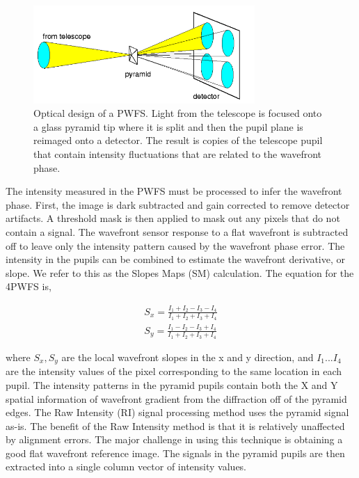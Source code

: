 \begin{figure}
    \centering
    \includegraphics[width=0.75\textwidth]{Chapter Materials/Chapter Two Materials/pyramid.png}
    \caption{Optical design of a PWFS. Light from the telescope is focused onto a glass pyramid tip where it is split and then the pupil plane is reimaged onto a detector. The result is copies of the telescope pupil that contain intensity fluctuations that are related to the wavefront phase.}
    \label{fig:pyramid}
\end{figure}


The intensity measured in the PWFS must be processed to infer the wavefront phase. First, the image is dark subtracted and gain corrected to remove detector artifacts. A threshold mask is then applied to mask out any pixels that do not contain a signal. The wavefront sensor response to a flat wavefront is subtracted off to leave only the intensity pattern caused by the wavefront phase error. The intensity in the pupils can be combined to estimate the wavefront derivative, or slope. We refer to this as the Slopes Maps (SM) calculation. The equation for the 4PWFS is,


\begin{eqnarray}
    S_x=\frac{I_1+I_2-I_3-I_4}{I_1+I_2+I_3+I_4}     \label{4PWFSslopes} \\
    S_y=\frac{I_1-I_2-I_3+I_4}{I_1+I_2+I_3+I_4} \nonumber
\end{eqnarray}

where $S_x, S_y$ are the local wavefront slopes in the x and y direction, and $I_1...I_4$ are the intensity values of the pixel corresponding to the same location in each pupil. The intensity patterns in the pyramid pupils contain both the X and Y spatial information of wavefront gradient from the diffraction off of the pyramid edges. The Raw Intensity (RI) signal processing method uses the pyramid signal as-is. The benefit of the Raw Intensity method is that it is relatively unaffected by alignment errors. The major challenge in using this technique is obtaining a good flat wavefront reference image. The signals in the pyramid pupils are then extracted into a single column vector of intensity values.


